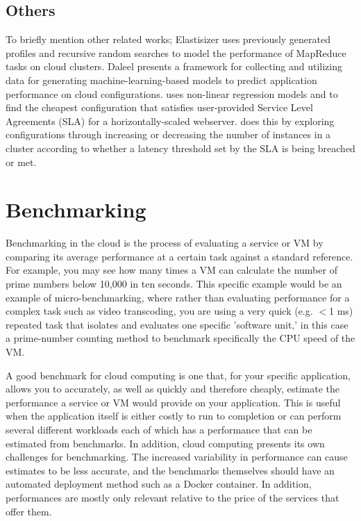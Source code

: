 \documentclass{report}
\begin{document}
\subsection{Others}
To briefly mention other related works; Elastisizer\cite{Herodotou2011} uses previously generated profiles and recursive random searches to model the performance of MapReduce tasks on cloud clusters. Daleel\cite{Samreen} presents a framework for collecting and utilizing data for generating machine-learning-based models to predict application performance on cloud configurations. \cite{Bodik2009} uses non-linear regression models and to find the cheapest configuration that satisfies user-provided Service Level Agreements (SLA) for a horizontally-scaled webserver. \cite{Bodik2009} does this by exploring configurations through increasing or decreasing the number of instances in a cluster according to whether a latency threshold set by the SLA is being breached or met. 

\section{Benchmarking}
Benchmarking in the cloud is the process of evaluating a service or VM by comparing its average performance at a certain task against a standard reference\cite{Binnig2009}. For example, you may see how many times a VM can calculate the number of prime numbers below 10,000 in ten seconds. This specific example would be an example of micro-benchmarking, where rather than evaluating performance for a complex task such as video transcoding, you are using a very quick (e.g. $<$1 ms) repeated task that isolates and evaluates one specific 'software unit,'\cite{Laaber2019} in this case a prime-number counting method to benchmark specifically the CPU speed of the VM.

A good benchmark for cloud computing is one that, for your specific application, allows you to accurately, as well as quickly and therefore cheaply, estimate the performance a service or VM would provide on your application. This is useful when the application itself is either costly to run to completion or can perform several different workloads each of which has a performance that can be estimated from benchmarks.
In addition, cloud computing presents its own challenges for benchmarking. The increased variability in performance can cause estimates to be less accurate, and the benchmarks themselves should have an automated deployment method such as a Docker container. In addition, performances are mostly only relevant relative to the price of the services that offer them\cite{Binnig2009}.
\end{document}
